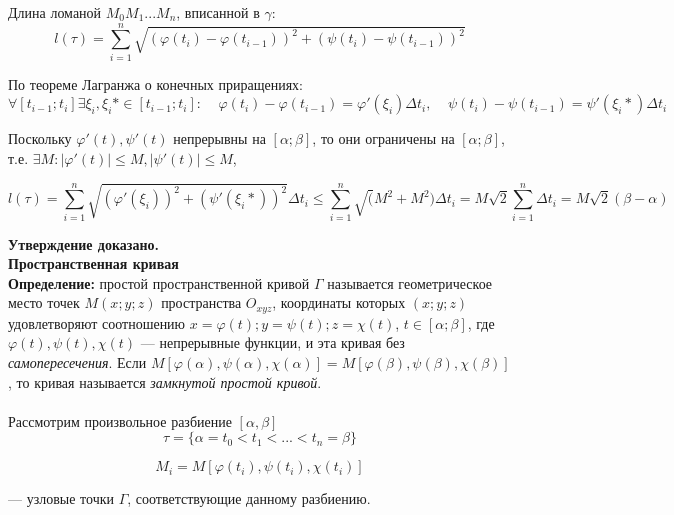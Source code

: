 \documentclass{article}
\begin{document}
  Длина ломаной $M_0M_1...M_n$, вписанной в $\gamma$:
  \begin{equation}
    l(\tau)=\sum_{i=1}^n \sqrt{(\varphi(t_i)-\varphi(t_{i-1}))^2+(\psi(t_i)-\psi(t_{i-1}))^2}
  \end{equation}
  
  По теореме Лагранжа о конечных приращениях:
  \begin{equation}
    \forall[t_{i-1};t_i] \exists \xi_i, \xi_i*\in[t_{i-1};t_i]:\;\;\;\; \varphi(t_i)-\varphi(t_{i-1})=\varphi'(\xi_i)\Delta t_i,\;\;\;\; \psi(t_i)-\psi(t_{i-1})=\psi'(\xi_i*)\Delta t_i
  \end{equation}
  
  Поскольку $\varphi'(t),\psi'(t)$ непрерывны на $[\alpha;\beta]$, то они ограничены на $[\alpha;\beta]$, т.е. $\exists M:|\varphi'(t)|\leq M, |\psi'(t)|\leq M$,
  
  \begin{equation}
    l(\tau)=\sum_{i=1}^n\sqrt{(\varphi'(\xi_i))^2+(\psi'(\xi_i*))^2}\Delta t_i\leq\sum_{i=1}^n\sqrt(M^2+M^2)\Delta t_i=M\sqrt{2}\sum_{i=1}^n\Delta t_i=M\sqrt{2}(\beta-\alpha)
  \end{equation}
  
  \textbf{Утверждение доказано.}\\
  
  \huge\textbf{Пространственная кривая}\normalsize\\
  
  \textbf{Определение:} простой пространственной кривой $\Gamma$ называется геометрическое место точек $M(x;y;z)$ пространства $O_{xyz}$, координаты которых $(x;y;z)$ удовлетворяют соотношению $x=\varphi(t); y=\psi(t); z=\chi(t)$, $t\in[\alpha;\beta]$, где $\varphi(t), \psi(t), \chi(t)$ --- непрерывные функции, и эта кривая без \textit{самопересечения}. Если $M[\varphi(\alpha),\psi(\alpha),\chi(\alpha)]=M[\varphi(\beta),\psi(\beta),\chi(\beta)]$, то кривая называется \textit{замкнутой простой кривой}.\\\\
  
  Рассмотрим произвольное разбиение $[\alpha,\beta]$ 
  \begin{equation}
    \tau=\{\alpha=t_0<t_1<...<t_n=\beta\}
  \end{equation}
  
  \begin{equation}
    M_i=M[\varphi(t_i),\psi(t_i),\chi(t_i)]
  \end{equation}

  --- узловые точки $\Gamma$, соответствующие данному разбиению.\\
  
\end{document}
